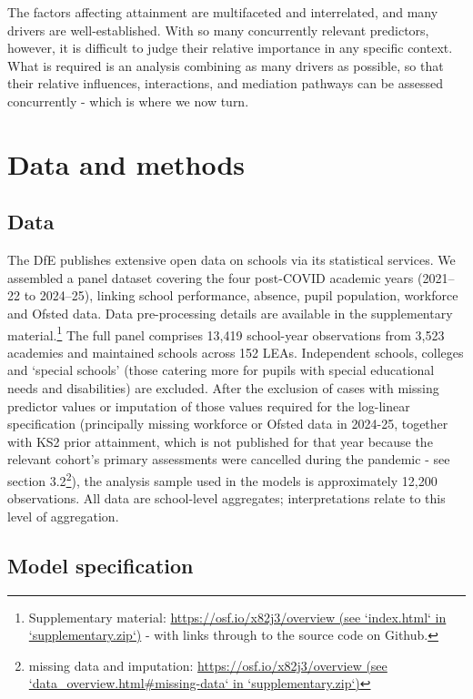 \documentclass[
  12pt,
  titlepage]{article}
\begin{document}
The factors affecting attainment are multifaceted and interrelated, and
many drivers are well-established. With so many concurrently relevant
predictors, however, it is difficult to judge their relative importance
in any specific context. What is required is an analysis combining as
many drivers as possible, so that their relative influences,
interactions, and mediation pathways can be assessed concurrently -
which is where we now turn.

\section{Data and methods}\label{data-and-methods}

\subsection{Data}\label{data}

The DfE publishes extensive open data on schools via its statistical
services. We assembled a panel dataset covering the four post-COVID
academic years (2021--22 to 2024--25), linking school performance,
absence, pupil population, workforce and Ofsted data. Data
pre-processing details are available in the supplementary
material.\footnote{Supplementary material:
  \href{https://osf.io/x82j3/overview}{https://osf.io/x82j3/overview
  (see `index.html` in `supplementary.zip`)} - with links through to the
  source code on Github.} The full panel comprises 13,419 school-year
observations from 3,523 academies and maintained schools across 152
LEAs. Independent schools, colleges and `special schools' (those
catering more for pupils with special educational needs and
disabilities) are excluded. After the exclusion of cases with missing
predictor values or imputation of those values required for the
log-linear specification (principally missing workforce or Ofsted data
in 2024-25, together with KS2 prior attainment, which is not published
for that year because the relevant cohort's primary assessments were
cancelled during the pandemic - see section 3.2\footnote{missing data
  and imputation:
  \href{https://osf.io/x82j3/overview}{https://osf.io/x82j3/overview
  (see `data\_overview.html\#missing-data` in `supplementary.zip`)}}),
the analysis sample used in the models is approximately 12,200
observations. All data are school-level aggregates; interpretations
relate to this level of aggregation.

\subsection{Model specification}\label{model-specification}
\end{document}
